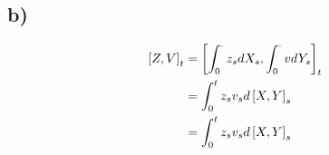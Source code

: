 \documentclass[document.tex]{subfiles}
\begin{document}
\subsection*{b)}

\begin{align*}
	\left[Z , V \right]_t &= \left[\int_0^\cdot z_s dX_s , \int_0^\cdot v dY_s \right]_t\\
&= \int_0^t z_s v_s d \left[X , Y \right]_s\\
&= \int_0^t z_s v_s d \left[X , Y \right]_s
\end{align*}
\end{document}
